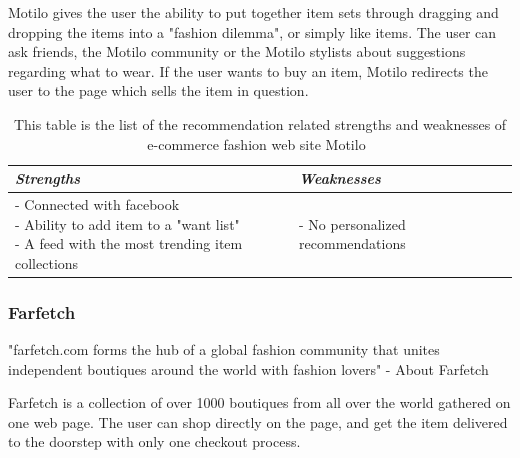     Motilo gives the user the ability to put together item sets through dragging and dropping the items into a "fashion dilemma", or simply like items.
    The user can ask friends, the Motilo community or the Motilo stylists about suggestions regarding what to wear.
    If the user wants to buy an item, Motilo redirects the user to the page which sells the item in question.
    \begin{table}[H]
        \centering
        \begin{tabular}{l|l}
            \toprule
            \emph{Strengths} & \emph{Weaknesses} \\ \hline
            \pbox{9cm}{
                - Connected with facebook \\
                - Ability to add item to a "want list" \\
                - A feed with the most trending item collections
            } & \pbox{9cm}{
                - No personalized recommendations \\
            } \\ \bottomrule
        \end{tabular}
        \caption[Recommendation related strengths and weaknesses of Motilo~\cite{motilo}]{This table is the list of the recommendation related strengths and weaknesses of e-commerce fashion web site Motilo~\cite{motilo}}
        \label{table:ecommenreceMotilo}
    \end{table}


\subsubsection{Farfetch} %
\label{par:farfetch}
    "farfetch.com forms the hub of a global fashion community that unites independent boutiques around the world with fashion lovers" - About Farfetch~\cite{Farfetch}

    Farfetch is a collection of over 1000 boutiques from all over the world gathered on one web page.
    The user can shop directly on the page, and get the item delivered to the doorstep with only one checkout process.


